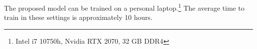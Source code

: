 
The proposed model can be trained on a personal
laptop.\footnote{ Intel i7 10750h, Nvidia RTX 2070, 32 GB
DDR4} The average time to train in these settings is
approximately 10 hours.

